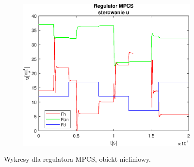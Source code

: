 \begin{figure}[h!]
   \begin{subfigure}[b]{0.4\textwidth}
      \includegraphics[width=1\linewidth]{img/MPCSanaRK/distMPCSRKControlN500Nu60l40.eps}
      \caption{}
      \label{fig:fig:distMPCSRKN500Nu60l403}
   \end{subfigure}
       
   \caption{Wykresy dla regulatora MPCS, obiekt nieliniowy.}
   \label{fig:distMPCSRKN500Nu60l40}
\end{figure}
           
